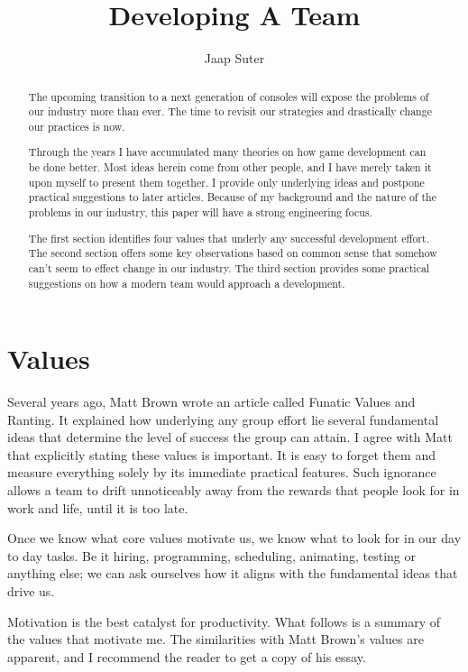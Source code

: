 \documentclass[twocolumn]{paper}
\begin{document}
\title{Developing A Team}
\author{Jaap Suter}
\maketitle

\begin{abstract}
The upcoming transition to a next generation of consoles will expose
the problems of our industry more than ever. The time to revisit our
strategies and drastically change our practices is now.

Through the years I have accumulated many theories on how game
development can be done better. Most ideas herein come from other
people, and I have merely taken it upon myself to present them
together. I provide only underlying ideas and postpone practical
suggestions to later articles. Because of my background and the
nature of the problems in our industry, this paper will have a
strong engineering focus.

The first section identifies four values that underly any successful
development effort. The second section offers some key observations
based on common sense that somehow can't seem to effect change in
our industry. The third section provides some practical suggestions
on how a modern team would approach a development.

\end{abstract}

\section{Values}

Several years ago, Matt Brown wrote an article called Funatic Values
and Ranting. It explained how underlying any group effort lie
several fundamental ideas that determine the level of success the
group can attain. I agree with Matt that explicitly stating these
values is important. It is easy to forget them and measure
everything solely by its immediate practical features. Such
ignorance allows a team to drift unnoticeably away from the rewards
that people look for in work and life, until it is too late.

Once we know what core values motivate us, we know what to look for
in our day to day tasks. Be it hiring, programming, scheduling,
animating, testing or anything else; we can ask ourselves how it
aligns with the fundamental ideas that drive us.

Motivation is the best catalyst for productivity. What follows is a
summary of the values that motivate me. The similarities with Matt
Brown's values are apparent, and I recommend the reader to get a
copy of his essay.
\end{document}
